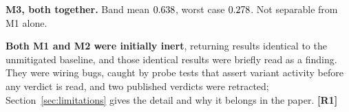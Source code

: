 \textbf{M3, both together.} Band mean $0.638$, worst case
$0.278$. Not separable from M1 alone.

\textbf{Both M1 and M2 were initially inert}, returning results identical to the
unmitigated baseline, and those identical results were briefly read as a finding.
They were wiring bugs, caught by probe tests that assert variant activity before
any verdict is read, and two published verdicts were retracted;
Section~\ref{sec:limitations} gives the detail and why it belongs in the paper.
\textbf{[R1]}
